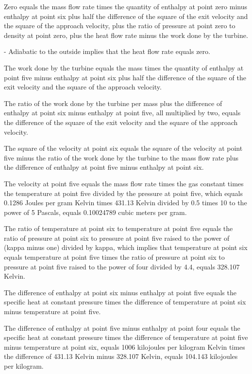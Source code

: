 Zero equals the mass flow rate times the quantity of enthalpy at point zero minus enthalpy at point six plus half the difference of the square of the exit velocity and the square of the approach velocity, plus the ratio of pressure at point zero to density at point zero, plus the heat flow rate minus the work done by the turbine.

- Adiabatic to the outside implies that the heat flow rate equals zero.

The work done by the turbine equals the mass times the quantity of enthalpy at point five minus enthalpy at point six plus half the difference of the square of the exit velocity and the square of the approach velocity.

The ratio of the work done by the turbine per mass plus the difference of enthalpy at point six minus enthalpy at point five, all multiplied by two, equals the difference of the square of the exit velocity and the square of the approach velocity.

The square of the velocity at point six equals the square of the velocity at point five minus the ratio of the work done by the turbine to the mass flow rate plus the difference of enthalpy at point five minus enthalpy at point six.

The velocity at point five equals the mass flow rate times the gas constant times the temperature at point five divided by the pressure at point five, which equals 0.1286 Joules per gram Kelvin times 431.13 Kelvin divided by 0.5 times 10 to the power of 5 Pascals, equals 0.10024789 cubic meters per gram.

The ratio of temperature at point six to temperature at point five equals the ratio of pressure at point six to pressure at point five raised to the power of (kappa minus one) divided by kappa, which implies that temperature at point six equals temperature at point five times the ratio of pressure at point six to pressure at point five raised to the power of four divided by 4.4, equals 328.107 Kelvin.

The difference of enthalpy at point six minus enthalpy at point five equals the specific heat at constant pressure times the difference of temperature at point six minus temperature at point five.

The difference of enthalpy at point five minus enthalpy at point four equals the specific heat at constant pressure times the difference of temperature at point five minus temperature at point six, equals 1006 kilojoules per kilogram Kelvin times the difference of 431.13 Kelvin minus 328.107 Kelvin, equals 104.143 kilojoules per kilogram.

